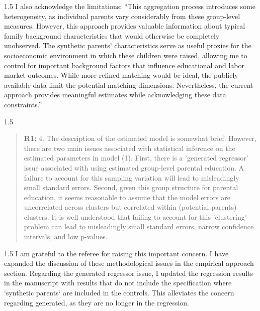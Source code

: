 \documentclass[12pt,english]{article}
\newcommand{\rrxspc}{1.5}
\begin{document}
\begin{refsection}
\begin{spacing}{\rrxspc}
    I also acknowledge the limitations: ``This aggregation process introduces some heterogeneity, as individual parents vary considerably from these group-level measures. However, this approach provides valuable information about typical family background characteristics that would otherwise be completely unobserved. The synthetic parents' characteristics serve as useful proxies for the socioeconomic environment in which these children were raised, allowing me to control for important background factors that influence educational and labor market outcomes. While more refined matching would be ideal, the publicly available data limit the potential matching dimensions. Nevertheless, the current approach provides meaningful estimates while acknowledging these data constraints.''
\end{spacing}

\begin{spacing}{\rrxspc}
    \begin{quotation}
        \textbf{R1: } 4. The description of the estimated model is somewhat brief. However, there are two main issues associated with statistical inference on the estimated parameters in model (1). First, there is a 'generated regressor' issue associated with using estimated group-level parental education. A failure to account for this sampling variation will lead to misleadingly small standard errors. Second, given this group structure for parental education, it seems reasonable to assume that the model errors are uncorrelated across clusters but correlated within (potential parents) clusters. It is well understood that failing to account for this 'clustering' problem can lead to misleadingly small standard errors, narrow confidence intervals, and low p-values.
    \end{quotation}
\end{spacing}

\begin{spacing}{\rrxspc}
    I am grateful to the referee for raising this important concern. I have expanded the discussion of these methodological issues in the empirical approach section. Regarding the generated regressor issue, I updated the regression results in the manuscript with results that do not include the specification where  `synthetic parents` are included in the controls. This alleviates the concern regarding generated, as they are no longer in the regression.
    
\end{spacing}



\end{refsection}
\end{document}
